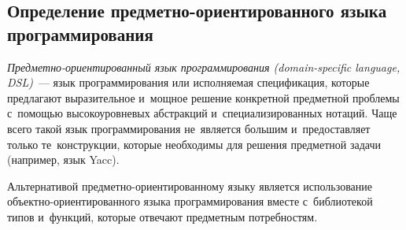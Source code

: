 \subsection{Определение предметно-ориентированного языка программирования} \label{sub121}

\textit{Предметно-ориентированный язык программирования (domain-specific language, DSL)}~--- язык программирования или исполняемая спецификация, которые предлагают выразительное и~мощное решение конкретной предметной проблемы с~помощью высокоуровневых абстракций и~специализированных нотаций. Чаще всего такой язык программирования не~является большим и~предоставляет только те~конструкции, которые необходимы для решения предметной задачи (например, язык Yacc).

Альтернативой предметно-ориентированному языку является использование объектно-ориентированного языка программирования вместе с~библиотекой типов и~функций, которые отвечают предметным потребностям.~\cite{Deursen1998}
